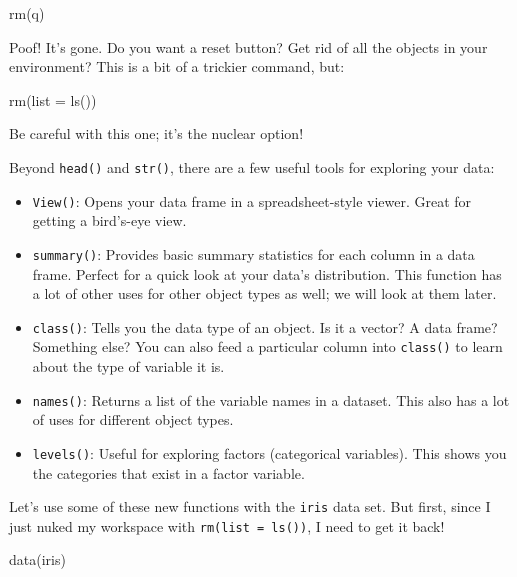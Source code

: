 \documentclass[
  letterpaper,
]{book}
\newenvironment{Shaded}{\begin{snugshade}}{\end{snugshade}}
\newcommand{\AttributeTok}[1]{\textcolor[rgb]{0.40,0.45,0.13}{#1}}
\newcommand{\FunctionTok}[1]{\textcolor[rgb]{0.28,0.35,0.67}{#1}}
\newcommand{\NormalTok}[1]{\textcolor[rgb]{0.00,0.23,0.31}{#1}}
\providecommand{\tightlist}{%
  \setlength{\itemsep}{0pt}\setlength{\parskip}{0pt}}\usepackage{longtable,booktabs,array}
\begin{document}
\begin{Shaded}
\begin{Highlighting}[]
\FunctionTok{rm}\NormalTok{(q)}
\end{Highlighting}
\end{Shaded}

Poof! It's gone. Do you want a reset button? Get rid of all the objects
in your environment? This is a bit of a trickier command, but:

\begin{Shaded}
\begin{Highlighting}[]
\FunctionTok{rm}\NormalTok{(}\AttributeTok{list =} \FunctionTok{ls}\NormalTok{())}
\end{Highlighting}
\end{Shaded}

Be careful with this one; it's the nuclear option!

Beyond \texttt{head()} and \texttt{str()}, there are a few useful tools
for exploring your data:

\begin{itemize}
\tightlist
\item
  \texttt{View()}: Opens your data frame in a spreadsheet-style viewer.
  Great for getting a bird's-eye view.
\item
  \texttt{summary()}: Provides basic summary statistics for each column
  in a data frame. Perfect for a quick look at your data's distribution.
  This function has a lot of other uses for other object types as well;
  we will look at them later.
\item
  \texttt{class()}: Tells you the data type of an object. Is it a
  vector? A data frame? Something else? You can also feed a particular
  column into \texttt{class()} to learn about the type of variable it
  is.
\item
  \texttt{names()}: Returns a list of the variable names in a dataset.
  This also has a lot of uses for different object types.
\item
  \texttt{levels()}: Useful for exploring factors (categorical
  variables). This shows you the categories that exist in a factor
  variable.
\end{itemize}

Let's use some of these new functions with the \texttt{iris} data set.
But first, since I just nuked my workspace with
\texttt{rm(list\ =\ ls())}, I need to get it back!

\begin{Shaded}
\begin{Highlighting}[]
\FunctionTok{data}\NormalTok{(iris)}
\end{Highlighting}
\end{Shaded}
\end{document}
